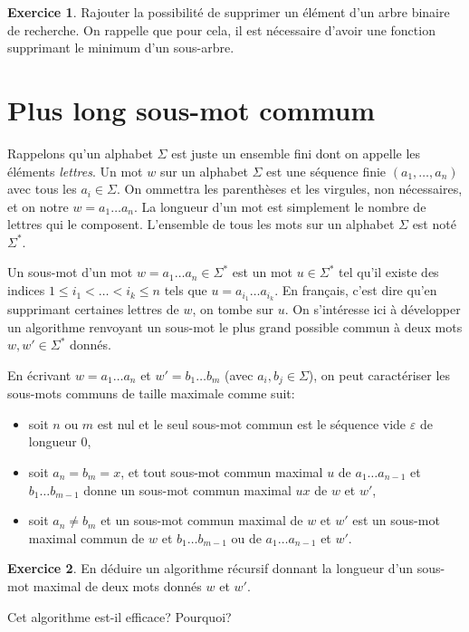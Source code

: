 \documentclass[french,a4paper]{article}
\theoremstyle{definition}
\newtheorem{exercise}{Exercice}
\theoremstyle{remark}
\begin{document}
\begin{exercise}
  Rajouter la possibilité de supprimer un élément d'un arbre binaire
  de recherche. On rappelle que pour cela, il est nécessaire d'avoir
  une fonction supprimant le minimum d'un sous-arbre.
\end{exercise}

\section{Plus long sous-mot commum}
\label{sec:lcs}

Rappelons qu'un alphabet $\Sigma$ est juste un ensemble fini dont on
appelle les éléments {\em lettres}. Un mot $w$ sur un alphabet
$\Sigma$ est une séquence finie $(a_1,\dots,a_n)$ avec tous les
$a_i \in \Sigma$. On ommettra les parenthèses et les virgules, non
nécessaires, et on notre $w = a_1\dots a_n$. La longueur d'un mot est
simplement le nombre de lettres qui le composent. L'ensemble de tous
les mots sur un alphabet $\Sigma$ est noté $\Sigma^\ast$.

Un sous-mot d'un mot $w = a_1\dots a_n \in \Sigma^\ast$ est un mot
$u \in \Sigma^\ast$ tel qu'il existe des indices
$1\leq i_1<\dots<i_k \leq n$ tels que $u = a_{i_1} \dots a_{i_k}$. En
français, c'est dire qu'en supprimant certaines lettres de $w$, on
tombe sur $u$. On s'intéresse ici à développer un algorithme renvoyant
un sous-mot le plus grand possible commun à deux mots
$w,w' \in \Sigma^\ast$ donnés.

En écrivant $w = a_1 \dots a_n$ et $w' = b_1 \dots b_m$ (avec
$a_i,b_j \in \Sigma$), on peut caractériser les sous-mots communs de
taille maximale comme suit:
\begin{itemize}
\item soit $n$ ou $m$ est nul et le seul sous-mot commun est le
  séquence vide $\varepsilon$ de longueur $0$,
\item soit $a_n = b_m = x$, et tout sous-mot commun maximal $u$ de
  $a_1\dots a_{n-1}$ et $b_1\dots b_{m-1}$ donne un sous-mot commun
  maximal $ux$ de $w$ et $w'$,
\item soit $a_n\neq b_m$ et un sous-mot commun maximal de $w$ et $w'$
  est un sous-mot maximal commun de $w$ et $b_1\dots b_{m-1}$ ou de
  $a_1\dots a_{n-1}$ et $w'$.
\end{itemize}

\begin{exercise}
  En déduire un algorithme récursif donnant la longueur d'un sous-mot
  maximal de deux mots donnés $w$ et $w'$.

  Cet algorithme est-il efficace? Pourquoi?
\end{exercise}
\end{document}
